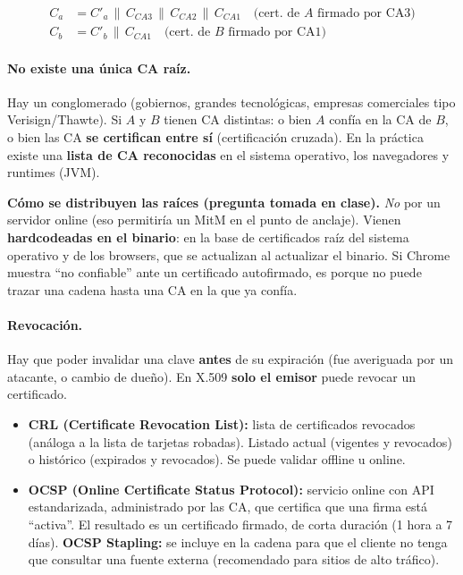 \documentclass[../main.tex]{subfiles}
\begin{document}
\begin{align*}
C_a &= C'_a \,\|\, C_{CA3} \,\|\, C_{CA2} \,\|\, C_{CA1} \quad \text{(cert.\ de } A \text{ firmado por CA3)}\\
C_b &= C'_b \,\|\, C_{CA1} \quad \text{(cert.\ de } B \text{ firmado por CA1)}
\end{align*}

\paragraph{No existe una única CA raíz.} Hay un conglomerado (gobiernos, grandes
tecnológicas, empresas comerciales tipo Verisign/Thawte). Si $A$ y $B$ tienen CA
distintas: o bien $A$ confía en la CA de $B$, o bien las CA \textbf{se certifican
entre sí} (certificación cruzada). En la práctica existe una \textbf{lista de CA
reconocidas} en el sistema operativo, los navegadores y runtimes (JVM).

\begin{destacado}
\textbf{Cómo se distribuyen las raíces (pregunta tomada en clase).} \emph{No} por un
servidor online (eso permitiría un MitM en el punto de anclaje). Vienen
\textbf{hardcodeadas en el binario}: en la base de certificados raíz del sistema
operativo y de los browsers, que se actualizan al actualizar el binario. Si Chrome
muestra ``no confiable'' ante un certificado autofirmado, es porque no puede trazar
una cadena hasta una CA en la que ya confía.
\end{destacado}

\paragraph{Revocación.} Hay que poder invalidar una clave \textbf{antes} de su
expiración (fue averiguada por un atacante, o cambio de dueño). En X.509 \textbf{solo
el emisor} puede revocar un certificado.
\begin{itemize}[leftmargin=1.4em]
  \item \textbf{CRL (Certificate Revocation List):} lista de certificados revocados
  (análoga a la lista de tarjetas robadas). Listado actual (vigentes y revocados) o
  histórico (expirados y revocados). Se puede validar offline u online.
  \item \textbf{OCSP (Online Certificate Status Protocol):} servicio online con API
  estandarizada, administrado por las CA, que certifica que una firma está
  ``activa''. El resultado es un certificado firmado, de corta duración (1 hora a 7
  días). \textbf{OCSP Stapling:} se incluye en la cadena para que el cliente no tenga
  que consultar una fuente externa (recomendado para sitios de alto tráfico).
\end{itemize}
\end{document}
